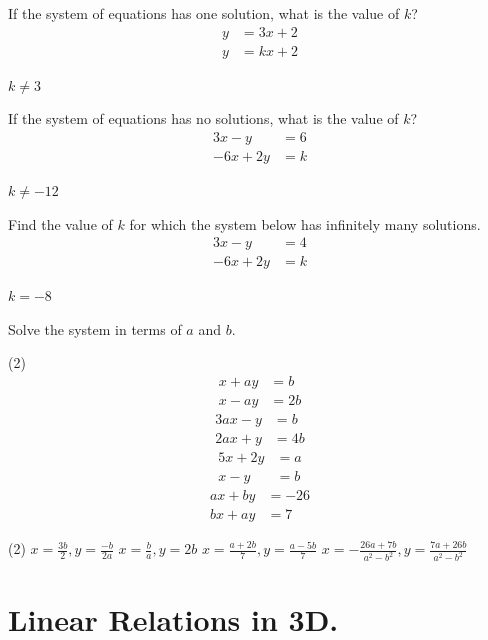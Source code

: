 \documentclass[12pt,fleqn]{book}
\newcommand{\prb}[1]{\begin{Exercise}#1\end{Exercise}}
\newcommand{\sol}[1]{\begin{Answer}#1\end{Answer}}
\begin{document}
\prb{ If the system of equations has one solution, what is the value of $k$?
\begin{align*}
y &= 3x+2 \\
y &= kx+2
\end{align*}
}
\vspace{1in}
\sol{$k\ne 3$}
\prb{ If the system of equations has no solutions, what is the value of $k$?
\begin{align*}
3x-y &= 6 \\
-6x+2y &= k
\end{align*}
}
\vspace{1in}
\sol{$k\ne -12$}
\prb{Find the value of $k$ for which the system below has infinitely many solutions.
\begin{align*}
3x-y &= 4 \\
-6x+2y &= k
\end{align*}
}
\sol{$k=-8$}
\vspace{1in}
\prb{Solve the system in terms of $a$ and $b$.
\begin{tasks}(2)
\task 	\vspace{-2.4em}
\begin{align*}
x+ay &= b \\
x-ay &= 2b
\end{align*}
\task	\vspace{-2.4em}
\begin{align*}
3ax-y&=b\\
2ax+y&=4b
\end{align*}
\vspace{1in}
\task	\vspace{-2.4em}
\begin{align*}
5x+2y &= a \\
x-y &= b
\end{align*}
\task 	\vspace{-2.4em}
\begin{align*}
	ax+by &= -26 \\
bx+ay &= 7
\end{align*}
\end{tasks}
}
\sol{
\begin{tasks}(2)
    \task $x=\frac{3b}{2}, y=\frac{-b}{2a}$
    \task $x=\frac{b}{a}, y=2b$
    \task $x=\frac{a+2b}{7}, y=\frac{a-5b}{7}$
    \task $x=-\frac{26a+7b}{a^2-b^2}, y=\frac{7a+26b}{a^2-b^2}$
\end{tasks}
}

\clearpage
\chapter{Linear Relations in 3D.}
\end{document}
